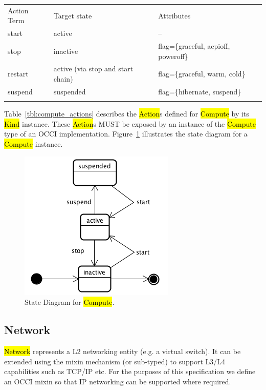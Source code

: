 \documentclass[10pt,a4paper]{article}
\begin{document}
{
	\begin{tabular}{lll}
	\toprule
	Action Term & Target state & Attributes \\
	\colrule
	start & active & -- \\
	stop & inactive & flag=\{graceful, acpioff, poweroff\} \\
	restart & active (via stop and start chain) & flag=\{graceful, warm, cold\} \\
	suspend & suspended & flag=\{hibernate, suspend\} \\
	\botrule
	\end{tabular}
}

Table~\ref{tbl:compute_actions} describes the \hl{Action}s defined for
\hl{Compute} by its \hl{Kind} instance. These \hl{Action}s MUST be exposed 
by an instance of the \hl{Compute} type of an OCCI implementation. 
Figure~\ref{fig:compute_state} illustrates the state diagram for a \hl{Compute} instance.

\begin{figure}[!h]
	\centering
	\includegraphics[scale=0.4]{figs/compute-state.png}
	\caption{State Diagram for \hl{Compute}.}
	\label{fig:compute_state}
\end{figure}

\subsection{Network}
\hl{Network} represents a L2 networking entity (e.g. a virtual switch). It can be extended using 
the mixin mechanism (or sub-typed) to support L3/L4 capabilities such as TCP/IP etc. 
For the purposes of this specification we define an OCCI mixin so that IP networking can be supported
where required. 
\end{document}

